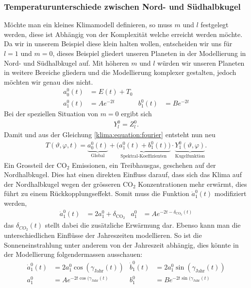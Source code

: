 \begin{refsection}
\subsubsection{Temperaturunterschiede zwischen Nord- und Südhalbkugel
\label{klima:subsubsection:halbkugel}}
Möchte man ein kleines Klimamodell definieren, so muss  $m$ und $l$ festgelegt werden, diese ist Abhängig von der Komplexität welche erreicht werden möchte. Da wir in unserem Beispiel diese klein halten wollen, entscheiden wir uns für $l=1$ und $m=0$, dieses Beispiel gliedert unseren Planeten in der Modellierung in Nord- und Südhalbkugel auf. Mit höheren $m$ und $l$ würden wir unseren Planeten in weitere Bereiche gliedern und die Modellierung komplexer gestalten, jedoch möchten wir genau dies nicht.
\begin{align*}
a^0_0(t)&=E(t)+T_0
\\
a^0_1(t) &=Ae^{-2t}&
b^0_1(t) &=Be^{-2t}
\end{align*}
Bei der speziellen Situation von $m=0$ ergibt sich
\begin{align*}
Y^0_l=Z^0_l.
\end{align*}
Damit und aus der Gleichung \eqref{klima:equation:fourier} entsteht nun neu
\begin{align}
T(\vartheta ,\varphi ,t)
=
\underbrace{a^0_0(t)}_{\text{Global}} + \underbrace{\bigl( a^0_1(t)+b^0_1(t) \bigr)}_{\text{Spektral-Koeffizienten}} \cdot \underbrace{Y^0_1(\vartheta ,\varphi)}_{\text{Kugelfunktion}}.
\end{align}
Ein Grossteil der CO$_2$ Emissionen, ein Treibhausgas, geschehen auf der Nordhalbkugel. Dies hat einen direkten Einfluss darauf, dass sich das Klima auf der Nordhalbkugel wegen der grösseren CO$_2$ Konzentrationen mehr erwärmt, dies führt zu einem Rückkopplungseffekt. Somit muss die Funktion $\dot a^0_1(t)$ modifiziert werden,
\begin{align*}
\dot a^0_1(t) &= 2a_1^0+\delta_{\text{CO}_2} &
a_1^0 &= Ae^{-2t-\delta_{\text{CO}_2}(t)}
\end{align*}
das $\delta_{CO_2}(t)$ stellt dabei die zusätzliche Erwärmung dar. Ebenso kann man die unterschiedlichen Einflüsse der Jahreszeiten modellieren. So ist die Sonneneinstrahlung unter anderem von der Jahreszeit abhängig, dies könnte in der Modellierung folgendermassen ausschauen:
\begin{align*}
\dot a_1^0(t) &= 2a_1^0 \cos(\gamma_{\text{Jahr}}(t)) &
\dot b_1^0(t) &= 2a_1^0 \sin(\gamma_{\text{Jahr}}(t))
\\
a_1^0 &= Ae^{-2t \cos(\gamma_{\text{Jahr}}(t)} &
b_1^0 &= Be^{-2t \sin(\gamma_{\text{Jahr}}(t)}
\end{align*}


\end{refsection}
